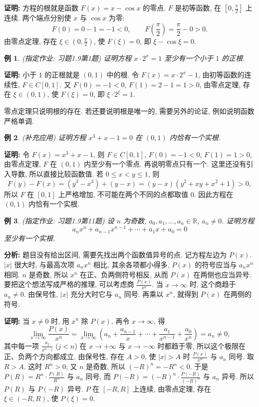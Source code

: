 \documentclass[UTF8,openany]{ctexbook}
\theoremstyle{chinesetextbook}
\newtheorem{example}{例}[section]
\newenvironment{cnproof}{\par\indent\textbf{证明:} \ignorespaces}{\par}
\begin{document}
\begin{cnproof}
方程的根就是函数 $F(x)=x-\cos x$ 的零点. $F$ 是初等函数, 在 $\displaystyle\left[0,\frac\pi2\right]$ 上连续. 两个端点分别使 $x$ 与 $\cos x$ 为零:
\[
F(0)=0-1=-1<0,\qquad F\!\left(\frac\pi2\right)=\frac\pi2-0>0.
\]
由零点定理, 存在 $\displaystyle\xi\in\left(0,\frac\pi2\right)$, 使 $F(\xi)=0$, 即 $\xi-\cos\xi=0$.
\end{cnproof}
\begin{example}
\textnormal{(指定作业: 习题1.9第1题)} 证明方程 $x\cdot2^x=1$ 至少有一个小于 $1$ 的正根.
\end{example}
\begin{cnproof}
小于 $1$ 的正根就是 $(0,1)$ 中的根. 令 $F(x)=x\cdot2^x-1$, 由初等函数的连续性, $F\in C[0,1]$. 又 $F(0)=-1<0$, $F(1)=2-1=1>0$, 由零点定理, 存在 $\xi\in(0,1)$, 使 $F(\xi)=0$, 即 $\xi\cdot2^\xi=1$.
\end{cnproof}
零点定理只说明根的存在. 若还要说明根是唯一的, 需要另外的论证, 例如说明函数严格单调.
\begin{example}
\textnormal{(补充应用)} 证明方程 $x^3+x-1=0$ 在 $(0,1)$ 内恰有一个实根.
\end{example}
\begin{cnproof}
令 $F(x)=x^3+x-1$, 则 $F\in C[0,1]$, $F(0)=-1<0$, $F(1)=1>0$, 由零点定理, $F$ 在 $(0,1)$ 内至少有一个零点. 再说明零点只有一个. 这里还没有引入导数, 所以直接比较函数值. 若 $0\le x<y\le1$, 则
\[
F(y)-F(x)=(y^3-x^3)+(y-x)=(y-x)(y^2+xy+x^2+1)>0,
\]
所以 $F$ 在 $[0,1]$ 上严格增加, 不可能在两个不同的点都取值 $0$. 因此方程在 $(0,1)$ 内恰有一个实根.
\end{cnproof}
\begin{example}
\textnormal{(指定作业: 习题1.9第11题)} 设 $n$ 为奇数, $a_0,a_1,\ldots,a_n\in\mathbb R$, $a_n\ne0$. 证明方程
\[
a_nx^n+a_{n-1}x^{n-1}+\cdots+a_1x+a_0=0
\]
至少有一个实根.
\end{example}
\par\indent\textbf{分析:} 题目没有给出区间, 需要先找出两个函数值异号的点. 记方程左边为 $P(x)$. $|x|$ 很大时, 与最高次项 $a_nx^n$ 相比, 其余各项都小得多, $P(x)$ 的符号应当与 $a_nx^n$ 相同. $n$ 是奇数, 所以 $x^n$ 在正、负两侧符号相反, 从而 $P(x)$ 在两侧也应当异号. 要把这个想法写成严格的推理, 可以考虑商 $\displaystyle\frac{P(x)}{x^n}$. 当 $x\to\infty$ 时, 这个商趋于 $a_n\ne0$. 由保号性, $|x|$ 充分大时它与 $a_n$ 同号. 再乘以 $x^n$, 就得到 $P(x)$ 在两侧的符号.
\begin{cnproof}
当 $x\ne0$ 时, 用 $x^n$ 除 $P(x)$, 再令 $x\to\infty$, 得
\[
\lim_{x\to\infty}\frac{P(x)}{x^n}=\lim_{x\to\infty}\left(a_n+\frac{a_{n-1}}x+\cdots+\frac{a_1}{x^{n-1}}+\frac{a_0}{x^n}\right)=a_n\ne0,
\]
其中每一项 $\displaystyle\frac{a_j}{x^{n-j}}$ ($j<n$) 在 $x\to+\infty$ 与 $x\to-\infty$ 时都趋于零, 所以这个极限在正、负两个方向都成立. 由保号性, 存在 $A>0$, 使 $|x|>A$ 时 $\displaystyle\frac{P(x)}{x^n}$ 与 $a_n$ 同号. 取 $R>A$. 这时 $R^n>0$; 又 $n$ 是奇数, 所以 $(-R)^n=-R^n<0$. 于是 $\displaystyle P(R)=R^n\cdot\frac{P(R)}{R^n}$ 与 $a_n$ 同号, 而 $\displaystyle P(-R)=(-R)^n\cdot\frac{P(-R)}{(-R)^n}$ 与 $a_n$ 异号. 所以 $P(R)$ 与 $P(-R)$ 异号. $P$ 在 $[-R,R]$ 上连续, 由零点定理, 存在 $\xi\in(-R,R)$, 使 $P(\xi)=0$.
\end{cnproof}
\end{document}
